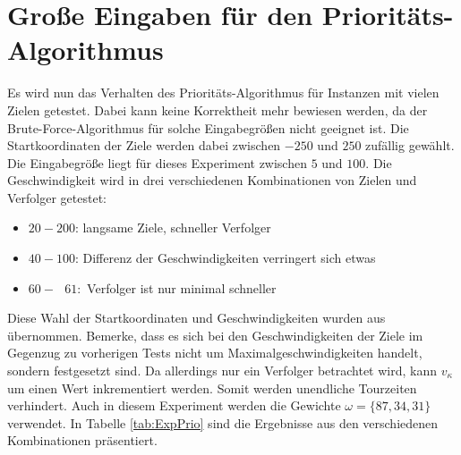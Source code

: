 \documentclass[german,version-2019-11]{uzl-thesis}
\begin{document}
\section{Große Eingaben für den Prioritäts-Algorithmus}
Es wird nun das Verhalten des Prioritäts-Algorithmus für Instanzen mit vielen Zielen getestet. Dabei kann keine Korrektheit mehr bewiesen werden, da der Brute-Force-Algorithmus für solche Eingabegrößen nicht geeignet ist. Die Startkoordinaten der Ziele werden dabei zwischen $-250$ und $250$ zufällig gewählt. Die Eingabegröße liegt für dieses Experiment zwischen $5$ und $100$. Die Geschwindigkeit wird in drei verschiedenen Kombinationen von Zielen und Verfolger getestet:
\begin{itemize}
\item $20-200$: langsame Ziele, schneller Verfolger
\item $40-100$: Differenz der Geschwindigkeiten verringert sich etwas
\item $60-~~~61$:~Verfolger ist nur minimal schneller
\end{itemize}
Diese Wahl der Startkoordinaten und Geschwindigkeiten wurden aus \cite{stieber2015multiple} übernommen. Bemerke, dass es sich bei den Geschwindigkeiten der Ziele im Gegenzug zu vorherigen Tests nicht um Maximalgeschwindigkeiten handelt, sondern festgesetzt sind. Da allerdings nur ein Verfolger betrachtet wird, kann $v_{\kappa}$ um einen Wert inkrementiert werden. Somit werden unendliche Tourzeiten verhindert. Auch in diesem Experiment werden die Gewichte $\omega = \{87,34,31\}$ verwendet. In Tabelle \ref{tab:ExpPrio} sind die Ergebnisse aus den verschiedenen Kombinationen präsentiert.
\end{document}
